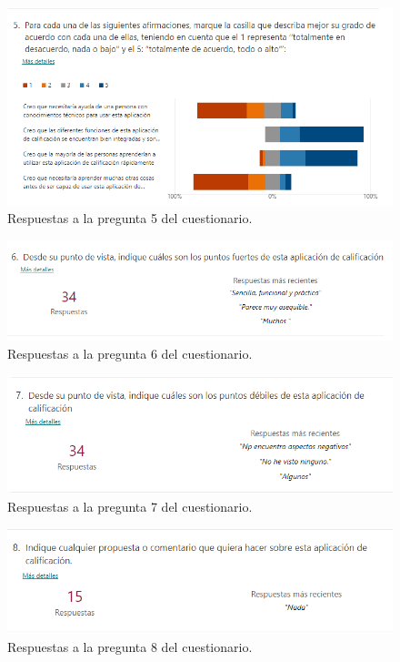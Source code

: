 \begin{figure}[h]
\centering\includegraphics[width=1\linewidth]{figs/cuestionario_5.png}
\caption{Respuestas a la pregunta 5 del cuestionario.}
\label{Fig:cuestionario_5}
\end{figure}

\begin{figure}[h]
\centering\includegraphics[width=1\linewidth]{figs/cuestionario_6.png}
\caption{Respuestas a la pregunta 6 del cuestionario.}
\label{Fig:cuestionario_6}
\end{figure}

\begin{figure}[h]
\centering\includegraphics[width=1\linewidth]{figs/cuestionario_7.png}
\caption{Respuestas a la pregunta 7 del cuestionario.}
\label{Fig:cuestionario_7}
\end{figure}

\begin{figure}[h]
\centering\includegraphics[width=1\linewidth]{figs/cuestionario_8.png}
\caption{Respuestas a la pregunta 8 del cuestionario.}
\label{Fig:cuestionario_8}
\end{figure}

